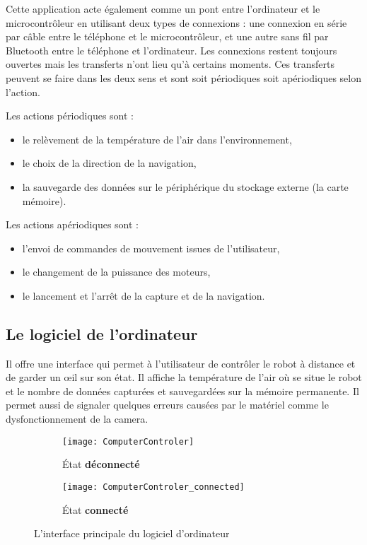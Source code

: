 Cette application acte également comme un pont entre l'ordinateur et le microcontrôleur
en utilisant deux types de connexions : une connexion en série par câble entre
le téléphone et le microcontrôleur, et une autre sans fil par Bluetooth entre
le téléphone et l'ordinateur. Les connexions restent toujours ouvertes
mais les transferts n'ont lieu qu'à certains moments. Ces transferts peuvent
se faire dans les deux sens et sont soit périodiques soit apériodiques selon l'action.

Les actions périodiques sont :
\begin{itemize}
  \item le relèvement de la température de l'air dans l'environnement,
  \item le choix de la direction de la navigation,
  \item la sauvegarde des données sur le périphérique du stockage externe (la carte mémoire).
\end{itemize}

\bigskip

Les actions apériodiques sont :
\begin{itemize}
  \item l'envoi de commandes de mouvement issues de l'utilisateur,
  \item le changement de la puissance des moteurs,
  \item le lancement et l'arrêt de la capture et de la navigation.
\end{itemize}

\subsection{Le logiciel de l'ordinateur}

Il offre une interface qui permet à l'utilisateur
de contrôler le robot à distance et de garder un œil sur son état. Il affiche la
température de l'air où se situe le robot et le nombre de données capturées et
sauvegardées sur la mémoire permanente. Il permet aussi de signaler quelques
erreurs causées par le matériel comme le dysfonctionnement de la camera.

\begin{figure}[h]
\begin{center}
  \begin{subfigure}{0.4\textwidth}
    \texttt{[image: ComputerControler]}
    \caption{\'Etat \textbf{déconnecté}}
  \end{subfigure}
  \hspace{2em}
  \begin{subfigure}{0.4\textwidth}
    \texttt{[image: ComputerControler\_connected]}
    \caption{\'Etat \textbf{connecté}}
  \end{subfigure}
  \caption{L'interface principale du logiciel d'ordinateur}
\end{center}
\end{figure}

